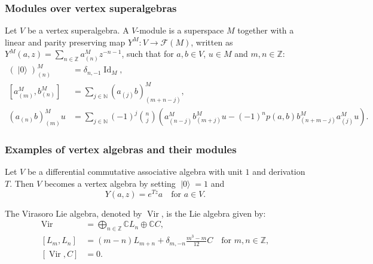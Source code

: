\documentclass{beamer}
\DeclareMathOperator{\Vir}{Vir}
\DeclareMathOperator{\Id}{Id}
\DeclareMathOperator{\vac}{|0\rangle}
\begin{document}
\begin{frame}
  \frametitle{Modules over vertex superalgebras}

  Let $V$ be a vertex superalgebra.
  A $V$-module is a superspace $M$ together with a linear and parity preserving map $Y^M: V \to \mathcal{F}(M)$, written as $Y^M(a, z) = \sum_{n \in \mathbb{Z}}a^M_{(n)}z^{-n - 1}$, such that for $a, b \in V$, $u \in M$ and $m, n \in \mathbb{Z}$:
  \begin{align*}
    (\vac)^M_{(n)} &= \delta_{n, -1}\Id_M, \\
    [a^M_{(m)}, b^M_{(n)}] &= \sum_{j \in \mathbb{N}}(a_{(j)}b)^M_{(m + n - j)}, \\
    (a_{(n)}b)^M_{(m)}u &= \sum_{j \in \mathbb{N}}(-1)^j\binom{n}{j}(a^M_{(n - j)}b^M_{(m + j)}u - (-1)^np(a, b)b^M_{(n + m - j)}a^M_{(j)}u).
  \end{align*}

\end{frame}

\begin{frame}
  \frametitle{Examples of vertex algebras and their modules}

  \begin{example}
    \label{exa:1}
    Let $V$ be a differential commutative associative algebra with unit $1$ and derivation $T$.
    Then $V$ becomes a vertex algebra by setting  $\vac = 1$ and
    \begin{equation*}
      Y(a, z) = e^{Tz}a \quad \text{for $a \in V$}.
    \end{equation*}
  \end{example}

  \begin{example}
    \label{exa:2}
    The Virasoro Lie algebra, denoted by $\Vir$, is the Lie algebra given by:
    \begin{align*}
      \Vir &= \bigoplus_{n \in \mathbb{Z}}\mathbb{C}L_n \oplus \mathbb{C}C, \\
      [L_m, L_n] &= (m - n)L_{m + n} + \delta_{m, -n}\frac{m^3 - m}{12}C \quad \text{for $m, n \in \mathbb{Z}$}, \\
      [\Vir, C] &= 0.
    \end{align*}
  \end{example}

\end{frame}
\end{document}

